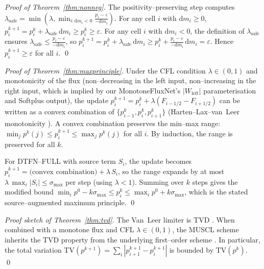 \documentclass[10pt]{article}
\theoremstyle{definition}
\theoremstyle{remark}
\newcommand{\Eps}{\varepsilon}
\begin{document}
\begin{proof}[Proof of Theorem~\ref{thm:nonneg}]
  The positivity--preserving step computes
  $\lambda_\text{safe} = \min(\lambda, \min_{i: \mathrm{d}m_i<0} \tfrac{p_i - \Eps}{-\mathrm{d}m_i})$.
  For any cell $i$ with $\mathrm{d}m_i \ge 0$,
  $p^{k+1}_i = p^k_i + \lambda_\text{safe}\, \mathrm{d}m_i \ge p^k_i \ge \Eps$.
  For any cell $i$ with $\mathrm{d}m_i < 0$, the definition of
  $\lambda_\text{safe}$ ensures
  $\lambda_\text{safe} \le \tfrac{p_i - \Eps}{-\mathrm{d}m_i}$, so
  $p^{k+1}_i = p^k_i + \lambda_\text{safe}\, \mathrm{d}m_i \ge p^k_i + \tfrac{p_i - \Eps}{-\mathrm{d}m_i}\, \mathrm{d}m_i = \Eps$.
  Hence $p^{k+1}_i \ge \Eps$ for all $i$.
  \qed
\end{proof}

\begin{proof}[Proof of Theorem~\ref{thm:maxprinciple}]
  Under the CFL condition $\lambda \in (0,1)$ and monotonicity of the
  flux (non--decreasing in the left input, non--increasing in the
  right input, which is implied by our MonotoneFluxNet's
  $|W_\text{left}|$ parameterisation and Softplus output), the update
  $p^{k+1}_i = p^k_i + \lambda(F_{i-1/2} - F_{i+1/2})$ can be written
  as a convex combination of $\{p^k_{i-1}, p^k_i, p^k_{i+1}\}$ (Harten--Lax--van~Leer
  monotonicity \cite{hartenson1983high}).  A convex combination
  preserves the min--max range:
  $\min_j p^k(j) \le p^{k+1}_i \le \max_j p^k(j)$ for all $i$.
  By induction, the range is preserved for all $k$.

  For DTFN--FULL with source term $S_i$, the update becomes
  $p^{k+1}_i = \text{(convex combination)} + \lambda\, S_i$, so the
  range expands by at most $\lambda\, \max_i |S_i| \le
  \sigma_{\max}$ per step (using $\lambda < 1$).  Summing over $k$
  steps gives the modified bound
  $\min_i p^0 - k\sigma_{\max} \le p^k_i \le \max_i p^0 + k\sigma_{\max}$,
  which is the stated source--augmented maximum principle.
  \qed
\end{proof}

\begin{proof}[Proof sketch of Theorem~\ref{thm:tvd}]
  The Van~Leer limiter is TVD \cite{vanleer1979towards,leveque2002finite}.
  When combined with a monotone flux and CFL $\lambda \in (0,1)$, the
  MUSCL scheme inherits the TVD property from the underlying
  first--order scheme \cite{hartenson1983high}.  In particular, the
  total variation
  $\mathrm{TV}(p^{k+1}) = \sum_i |p^{k+1}_{i+1} - p^{k+1}_i|$
  is bounded by $\mathrm{TV}(p^k)$.
  \qed
\end{proof}
\end{document}
